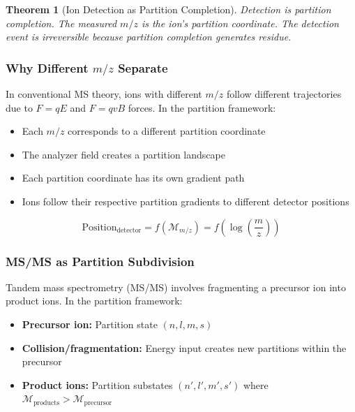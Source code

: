 \documentclass[twocolumn,10pt,a4paper]{article}
\newtheorem{theorem}{Theorem}[section]
\theoremstyle{definition}
\theoremstyle{remark}
\newcommand{\Depth}{\mathcal{M}}
\begin{document}
\begin{theorem}[Ion Detection as Partition Completion]
\label{thm:ion_detection}
Detection is partition completion. The measured $m/z$ is the ion's partition coordinate. The detection event is irreversible because partition completion generates residue.
\end{theorem}

\subsubsection{Why Different $m/z$ Separate}

In conventional MS theory, ions with different $m/z$ follow different trajectories due to $F = qE$ and $F = qvB$ forces. In the partition framework:

\begin{itemize}
    \item Each $m/z$ corresponds to a different partition coordinate
    \item The analyzer field creates a partition landscape
    \item Each partition coordinate has its own gradient path
    \item Ions follow their respective partition gradients to different detector positions
\end{itemize}

\begin{equation}
    \text{Position}_{\text{detector}} = f(\Depth_{m/z}) = f\left(\log\left(\frac{m}{z}\right)\right)
\end{equation}

\subsubsection{MS/MS as Partition Subdivision}

Tandem mass spectrometry (MS/MS) involves fragmenting a precursor ion into product ions. In the partition framework:

\begin{itemize}
    \item \textbf{Precursor ion:} Partition state $(n, l, m, s)$
    \item \textbf{Collision/fragmentation:} Energy input creates new partitions within the precursor
    \item \textbf{Product ions:} Partition substates $(n', l', m', s')$ where $\Depth_{\text{products}} > \Depth_{\text{precursor}}$
\end{itemize}
\end{document}
